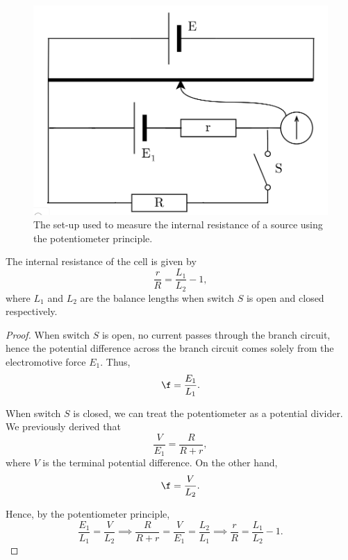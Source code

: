 \begin{figure}[H]
    \centering
    \includegraphics[scale=0.3]{media/Potentiometer Circuit - Internal Resistance.png}
    \caption{The set-up used to measure the internal resistance of a source using the potentiometer principle.}
\end{figure}

\begin{proposition}
    The internal resistance of the cell is given by \[\frac{r}{R} = \frac{L_1}{L_2} - 1,\] where $L_1$ and $L_2$ are the balance lengths when switch $S$ is open and closed respectively.
\end{proposition}
\begin{proof}
    When switch $S$ is open, no current passes through the branch circuit, hence the potential difference across the branch circuit comes solely from the electromotive force $E_1$. Thus, \[\f = \frac{E_1}{L_1}.\]

    When switch $S$ is closed, we can treat the potentiometer as a potential divider. We previously derived that \[\frac{V}{E_1} = \frac{R}{R + r},\] where $V$ is the terminal potential difference. On the other hand, \[\f = \frac{V}{L_2}.\]

    Hence, by the potentiometer principle, \[\frac{E_1}{L_1} = \frac{V}{L_2} \implies \frac{R}{R + r} = \frac{V}{E_1} = \frac{L_2}{L_1} \implies \frac{r}{R} = \frac{L_1}{L_2} - 1.\]
\end{proof}